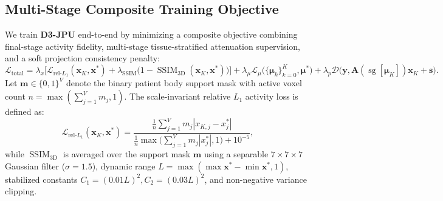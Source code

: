 \documentclass[11pt, a4paper]{article}
\begin{document}
\subsection{Multi-Stage Composite Training Objective}
We train \textbf{D3-JPU} end-to-end by minimizing a composite objective combining final-stage activity fidelity, multi-stage tissue-stratified attenuation supervision, and a soft projection consistency penalty:
\begin{equation}
\mathcal{L}_{\text{total}} = \lambda_x \Big[ \mathcal{L}_{\text{rel-}L_1}(\mathbf{x}_K, \mathbf{x}^*) + \lambda_{\text{SSIM}} \big(1 - \operatorname{SSIM}_{\text{3D}}(\mathbf{x}_K, \mathbf{x}^*)\big) \Big] + \lambda_\mu \mathcal{L}_\mu\big(\{\boldsymbol{\mu}_k\}_{k=0}^K, \boldsymbol{\mu}^*\big) + \lambda_p \mathcal{D}\big(\mathbf{y}, \mathbf{A}(\operatorname{sg}[\boldsymbol{\mu}_K])\mathbf{x}_K + \mathbf{s}\big).
\end{equation}
Let $\mathbf{m} \in \{0, 1\}^V$ denote the binary patient body support mask with active voxel count $n = \max(\sum_{j=1}^V m_j, 1)$. The scale-invariant relative $L_1$ activity loss is defined as:
\begin{equation}
\mathcal{L}_{\text{rel-}L_1}(\mathbf{x}_K, \mathbf{x}^*) = \frac{\frac{1}{n} \sum_{j=1}^V m_j |x_{K,j} - x_j^*|}{\frac{1}{n} \max\!\big(\sum_{j=1}^V m_j |x_j^*|, 1\big) + 10^{-5}},
\end{equation}
while $\operatorname{SSIM}_{\text{3D}}$ \cite{ref38} is averaged over the support mask $\mathbf{m}$ using a separable $7 \times 7 \times 7$ Gaussian filter ($\sigma = 1.5$), dynamic range $L = \max(\max \mathbf{x}^* - \min \mathbf{x}^*, 1)$, stabilized constants $C_1 = (0.01 L)^2, C_2 = (0.03 L)^2$, and non-negative variance clipping.
\end{document}
